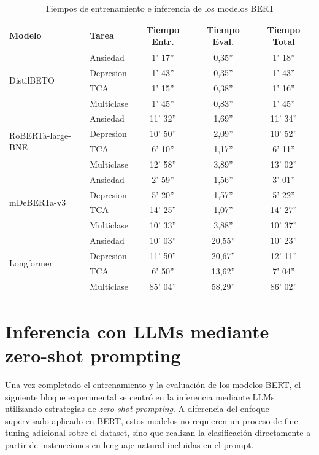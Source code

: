 \begin{table}[H]
	\centering
	\caption{Tiempos de entrenamiento e inferencia de los modelos BERT}
	\label{tab:bert_times}
	\begin{tabular}{|l|l|c|c|c|}
		\hline
		\textbf{Modelo} & \textbf{Tarea} & \textbf{Tiempo Entr.} & \textbf{Tiempo Eval.} & \textbf{Tiempo Total} \\
		\hline
		
		\multirow{4}{*}{DistilBETO}
		& Ansiedad & 1' 17'' & 0,35'' & 1' 18'' \\
		& Depresion & 1' 43'' & 0,35'' & 1' 43'' \\
		& TCA & 1' 15'' & 0,38'' & 1' 16'' \\
		& Multiclase & 1' 45'' & 0,83'' & 1' 45'' \\
		\hline
		
		\multirow{4}{*}{RoBERTa-large-BNE}
		& Ansiedad & 11' 32'' & 1,69'' & 11' 34'' \\
		& Depresion & 10' 50'' & 2,09'' & 10' 52'' \\
		& TCA & 6' 10'' & 1,17'' & 6' 11'' \\
		& Multiclase & 12' 58'' & 3,89'' & 13' 02'' \\
		\hline
		
		\multirow{4}{*}{mDeBERTa-v3}
		& Ansiedad & 2' 59'' & 1,56'' & 3' 01'' \\
		& Depresion & 5' 20'' & 1,57'' & 5' 22'' \\
		& TCA & 14' 25'' & 1,07'' & 14' 27'' \\
		& Multiclase & 10' 33'' & 3,88'' & 10' 37'' \\
		\hline
		
		\multirow{4}{*}{Longformer}
		& Ansiedad & 10' 03'' & 20,55'' & 10' 23'' \\
		& Depresion & 11' 50'' & 20,67'' & 12' 11'' \\
		& TCA & 6' 50'' & 13,62'' & 7' 04'' \\
		& Multiclase & 85' 04'' & 58,29'' & 86' 02'' \\
		\hline
		
	\end{tabular}
\end{table}


\section{Inferencia con LLMs mediante zero-shot prompting}

Una vez completado el entrenamiento y la evaluación de los modelos \ac{BERT}, el siguiente bloque experimental se centró en la inferencia mediante \acp{LLM} utilizando estrategias de \textit{zero-shot prompting}. A diferencia del enfoque supervisado aplicado en \ac{BERT}, estos modelos no requieren un proceso de fine-tuning adicional sobre el dataset, sino que realizan la clasificación directamente a partir de instrucciones en lenguaje natural incluidas en el prompt.

